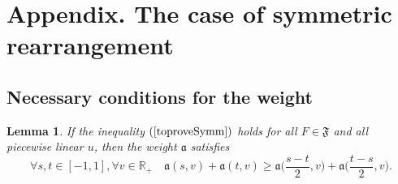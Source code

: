 \documentclass[12pt]{article}
\newcommand{\Real}{\mathbb R}
\renewcommand{\ge}{\geqslant}
\newtheorem{lm}{Lemma}
\begin{document}
\section{Appendix. The case of symmetric rearrangement}

\subsection{Necessary conditions for the weight}

\begin{lm}
If the inequality $(\ref{toproveSymm})$ holds for all $F \in \mathfrak{F}$
and all piecewise linear $u$, then
the weight $\mathfrak a$ satisfies
\begin{equation}
\label{almostConvex}
\forall s, t \in [-1, 1], \forall v \in \Real_+ \quad
\mathfrak a( s, v ) + \mathfrak a( t, v ) \ge \mathfrak a\Big( \frac{ s - t }{2}, v \Big) + \mathfrak a\Big( \frac{ t - s }{2}, v \Big).
\end{equation}
\end{lm}
\end{document}
